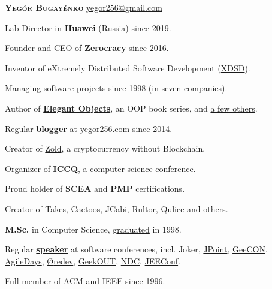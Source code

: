 \documentclass{./yb}
\begin{document}
\ybPrintPhoto{}

{\scshape\bfseries\Large Yeg\'or Bugay\'enko}\newline
\href{mailto:yegor256@gmail.com}{yegor256@gmail.com}

\vspace{1em}

Lab Director in \textbf{\href{https://www.huawei.com}{Huawei}} (Russia) since 2019.

Founder and CEO of \textbf{\href{https://www.zerocracy.com}{Zerocracy}} since 2016.

Inventor of eXtremely Distributed Software Development (\href{https://www.xdsd.org}{XDSD}).

Managing software projects since 1998 (in seven companies).

Author of \textbf{\href{https://www.yegor256.com/elegant-objects.html}{Elegant Objects}},
  an OOP book series, and \href{https://www.yegor256.com/books.html}{a few others}.

Regular \textbf{blogger} at \href{https://www.yegor256.com/}{yegor256.com} since 2014.

Creator of \href{https://www.zold.io}{Zold}, a cryptocurrency without Blockchain.

Organizer of \href{https://www.iccq.ru}{\textbf{ICCQ}}, a computer science conference.

Proud holder of \textbf{SCEA} and
  \textbf{PMP} certifications.

Creator of \href{http://www.takes.org}{Takes},
  \href{http://www.cactoos.org}{Cactoos},
  \href{http://www.jcabi.com}{JCabi},
  \href{http://www.rultor.com}{Rultor},
  \href{http://www.qulice.com}{Qulice} and
  \href{https://www.yegor256.com/pets.html}{others}.

\textbf{M.Sc.} in Computer Science,
  \href{https://en.wikipedia.org/wiki/Oles_Honchar_Dnipro_National_University}{graduated} in 1998.

Regular \textbf{\href{https://www.yegor256.com/talks.html}{speaker}}
  at software conferences, incl.
  Joker,
  \href{https://www.youtube.com/watch?v=20QBvrHq6TA}{JPoint},
  \href{https://vimeo.com/177215750}{GeeCON},
  \href{https://www.youtube.com/watch?v=TLM9eN0b6zo}{AgileDays},
  \href{https://www.youtube.com/watch?v=03PXmPc7Q3g}{{\O}redev},
  \href{https://www.youtube.com/watch?v=7yTIWFZrXpg}{GeekOUT},
  \href{https://www.youtube.com/watch?v=vU_x6oK437I}{NDC},
  \href{https://www.youtube.com/watch?v=GS45LzE3LPQ}{JEEConf}.

Full member of ACM and IEEE since 1996.
\end{document}
